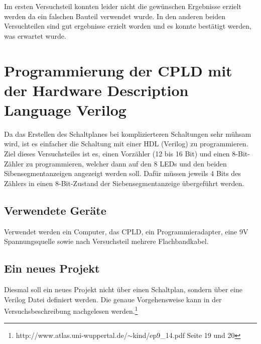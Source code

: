 \documentclass[12pt,a4paper]{article}
\begin{document}
Im ersten Versuchsteil konnten leider nicht die gewünschen Ergebnisse erzielt werden da ein falschen Bauteil verwendet wurde. In den anderen beiden Versuchteilen sind gut ergebnisse erzielt worden und es konnte bestätigt werden, was erwartet wurde.

\section{Programmierung der CPLD mit der Hardware Description Language Verilog}
Da das Erstellen des Schaltplanes bei komplizierteren Schaltungen sehr mühsam wird, ist es einfacher die Schaltung mit einer HDL (Verilog) zu programmieren. Ziel dieses Versuchsteiles ist es, einen Vorzähler (12 bis 16 Bit) und einen 8-Bit-Zähler zu programmieren, welcher dann auf den 8 LEDs und den beiden Sibensegmentanzeigen angezeigt werden soll. Dafür müssen jeweils 4 Bits des Zählers in einen 8-Bit-Zustand der Siebensegmentanzeige übergeführt werden.
\subsection*{Verwendete Geräte}
Verwendet werden ein Computer, das CPLD, ein Programmieradapter, eine 9V Spannungsquelle sowie nach Versuchsteil mehrere Flachbandkabel.
\subsection{Ein neues Projekt}
Diesmal soll ein neues Projekt nicht über einen Schaltplan, sondern über eine Verilog Datei definiert werden.
Die genaue Vorgehensweise kann in der Versuchsbeschreibung nachgelesen werden.\footnote{http://www.atlas.uni-wuppertal.de/$\sim$kind/ep9\_14.pdf Seite 19 und 20}
\end{document}
